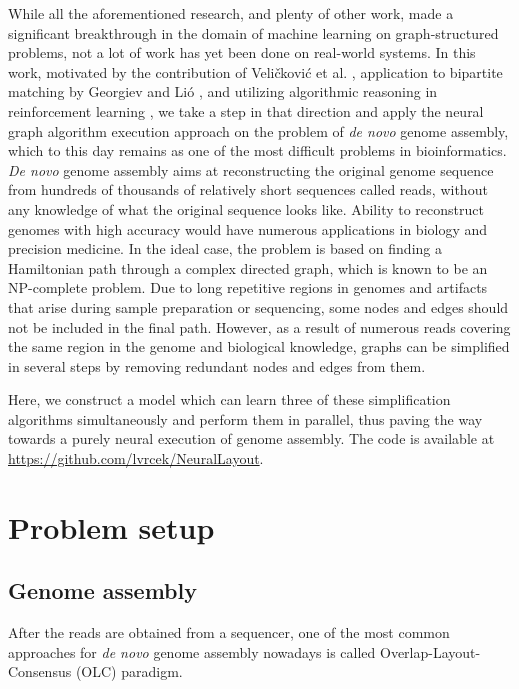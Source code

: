 \documentclass{article}
\begin{document}
While all the aforementioned research, and plenty of other work, made a significant breakthrough in the domain of machine learning on graph-structured problems, not a lot of work has yet been done on real-world systems. In this work, motivated by the contribution of Veličković et al. \cite{velivckovic2019neural}, application to bipartite matching by Georgiev and Li{\'o} \cite{georgiev2020neural}, and utilizing algorithmic reasoning in reinforcement learning \cite{deac2020xlvin}, we take a step in that direction and apply the neural graph algorithm execution approach on the problem of \textit{de novo} genome assembly, which to this day remains as one of the most difficult problems in bioinformatics. \textit{De novo} genome assembly aims at reconstructing the original genome sequence from hundreds of thousands of relatively short sequences called reads, without any knowledge of what the original sequence looks like. Ability to reconstruct genomes with high accuracy would have numerous applications in biology and precision medicine. In the ideal case, the problem is based on finding a Hamiltonian path through a complex directed graph, which is known to be an NP-complete problem. Due to long repetitive regions in genomes and artifacts that arise during sample preparation or sequencing, some nodes and edges should not be included in the final path. However, as a result of numerous reads covering the same region in the genome and biological knowledge, graphs can be simplified in several steps by removing redundant nodes and edges from them.

Here, we construct a model which can learn three of these simplification algorithms simultaneously and perform them in parallel, thus paving the way towards a purely neural execution of genome assembly. The code is available at \url{https://github.com/lvrcek/NeuralLayout}.


\section{Problem setup}

\subsection{Genome assembly}

After the reads are obtained from a sequencer, one of the most common approaches for \textit{de novo} genome assembly nowadays is called Overlap-Layout-Consensus (OLC) paradigm.
\end{document}
